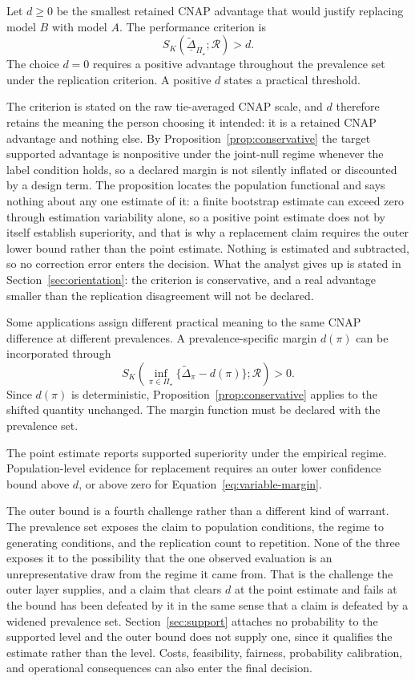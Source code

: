 \documentclass[11pt]{article}
\newcommand{\Regime}{\mathcal{R}}
\newcommand{\PSet}{\Pi_\star}
\newcommand{\Dta}{\widetilde{\Delta}}
\newcommand{\RobDta}{\underline{\widetilde{\Delta}}_{\PSet}}
\theoremstyle{remark}
\begin{document}
Let $d\geq0$ be the smallest retained CNAP advantage that would justify replacing model $B$ with model $A$. The performance criterion is
\begin{equation}
S_K(\RobDta;\Regime)>d.
\label{eq:replacement}
\end{equation}
The choice $d=0$ requires a positive advantage throughout the prevalence set under the replication criterion. A positive $d$ states a practical threshold.

The criterion is stated on the raw tie-averaged CNAP scale, and $d$ therefore retains the meaning the person choosing it intended: it is a retained CNAP advantage and nothing else. By Proposition~\ref{prop:conservative} the target supported advantage is nonpositive under the joint-null regime whenever the label condition holds, so a declared margin is not silently inflated or discounted by a design term. The proposition locates the population functional and says nothing about any one estimate of it: a finite bootstrap estimate can exceed zero through estimation variability alone, so a positive point estimate does not by itself establish superiority, and that is why a replacement claim requires the outer lower bound rather than the point estimate. Nothing is estimated and subtracted, so no correction error enters the decision. What the analyst gives up is stated in Section~\ref{sec:orientation}: the criterion is conservative, and a real advantage smaller than the replication disagreement will not be declared.

Some applications assign different practical meaning to the same CNAP difference at different prevalences. A prevalence-specific margin $d(\pi)$ can be incorporated through
\begin{equation}
S_K\left(
\inf_{\pi\in\PSet}
\{\Dta_\pi-d(\pi)\};
\Regime
\right)>0.
\label{eq:variable-margin}
\end{equation}
Since $d(\pi)$ is deterministic, Proposition~\ref{prop:conservative} applies to the shifted quantity unchanged. The margin function must be declared with the prevalence set.

The point estimate reports supported superiority under the empirical regime. Population-level evidence for replacement requires an outer lower confidence bound above $d$, or above zero for Equation~\eqref{eq:variable-margin}.

The outer bound is a fourth challenge rather than a different kind of warrant. The prevalence set exposes the claim to population conditions, the regime to generating conditions, and the replication count to repetition. None of the three exposes it to the possibility that the one observed evaluation is an unrepresentative draw from the regime it came from. That is the challenge the outer layer supplies, and a claim that clears $d$ at the point estimate and fails at the bound has been defeated by it in the same sense that a claim is defeated by a widened prevalence set. Section~\ref{sec:support} attaches no probability to the supported level and the outer bound does not supply one, since it qualifies the estimate rather than the level. Costs, feasibility, fairness, probability calibration, and operational consequences can also enter the final decision.
\end{document}
